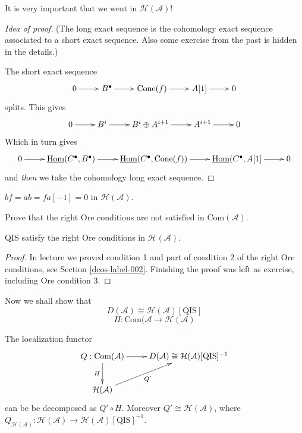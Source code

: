It is very important that we went in
$\mathcal{H}(\mathcal{A})$!

\begin{proof}[Idea of proof]
(The long exact sequence is the cohomology
exact sequence associated to a short exact
sequence. Also some exercise from the past is
hidden in the details.)

The short exact sequence
$$
\xymatrix{
0\ar[r]&B^{\bullet}\ar[r]&\text{Cone}(f)
\ar[r]
&A[1]\ar[r]&0
}
$$
splits. This gives
$$
\xymatrix{
0\ar[r]&B^i\ar[r]&B^i\oplus
A^{i+1}\ar[r]&A^{i+1}\ar[r]&0
}
$$
Which in turn gives
$$
\xymatrix{
0\ar[r]&\underline{\text{Hom}}(C^{\bullet},
B^{\bullet})
\ar[r]&\underline{\text{Hom}}(C^{\bullet},
\text{Cone}(f))
\ar[r]&\underline{\text{Hom}}(C^{\bullet},
A[1]
\ar[r]&0
}
$$
and {\it then} we take the cohomology long
exact sequence.
\end{proof}

\begin{exercise}
\label{exercise-simple}
$bf=ab=fa[-1]=0$ in
$\mathcal{H}(\mathcal{A})$.
\end{exercise}

\begin{exercise}
\label{dcos-label-006}
Prove that the right Ore conditions are not
satisfied in $\text{Com}(\mathcal{A})$.
\end{exercise}

\begin{proposition}
\label{dcos-label-007}
QIS satisfy the right Ore conditions in
$\mathcal{H}(\mathcal{A})$.
\end{proposition}

\begin{proof}
In lecture we proved condition 1 and part of
condition 2 of the right Ore conditions, see
Section \ref{dcos-label-002}.
Finishing the proof was
left as exercise, including Ore condition 3.
\end{proof}

\bigskip\noindent
Now we shall show that
$$
D(\mathcal{A})\cong
\mathcal{H}(\mathcal{A})[\text{QIS}]
$$
$$
H:\text{Com}(\mathcal{A}\to
\mathcal{H}(\mathcal{A})
$$
\begin{proposition}
\label{proposition-localization-functor}
The localization functor
$$
\xymatrix{
Q:\text{Com}(\mathcal{A})\ar[d]_H\ar[r]
&
D(\mathcal{A})\cong\mathcal{H}(\mathcal{A})
[\text{QIS}]^{-1}\\
\mathcal{H}(\mathcal{A})\ar[ur]_{Q'}
}
$$
can be be decomposed as $Q' \circ H$.
Moreover $Q' \cong
\mathcal{H}(\mathcal{A})$, where
$Q_{\mathcal{H}(\mathcal{A})}:\mathcal{H}
(\mathcal{A})
\to
\mathcal{H}(\mathcal{A})[\text{QIS}]^{-1}$.
\end{proposition}

